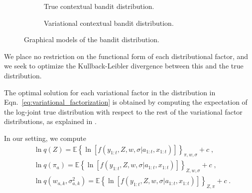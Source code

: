 \documentclass{article}
\newcommand{\eValue}[1]{\mathbb{E}\left\{ #1 \right\}}
\begin{document}
\begin{figure}[!h]
	\centering
	\begin{subfigure}[b]{0.49\textwidth}
		\begin{center}
			
		\end{center}
		\label{fig:true_bandit}
		\caption{True contextual bandit distribution.}
	\end{subfigure}
	\begin{subfigure}[b]{0.49\textwidth}	
		\begin{center}
			
		\end{center}
		\label{fig:variational_bandit}
		\caption{Variational contextual bandit distribution.}
	\end{subfigure}
	\caption{Graphical models of the bandit distribution.}
	\label{fig:graphical_bandit}
\end{figure}

We place no restriction on the functional form of each distributional factor, and we seek to optimize the Kullback-Leibler divergence between this and the true distribution.

The optimal solution for each variational factor in the distribution in Eqn.~\eqref{eq:variational_factorization} is obtained by computing the expectation of the log-joint true distribution with respect to the rest of the variational factor distributions, as explained in \cite{b-Bishop2006}.

In our setting, we compute
\begin{equation}
\begin{split}
&\ln q(Z) =\eValue{\ln\left[f(y_{1:t}, Z, w, \sigma|a_{1:t}, x_{1:t})\right]}_{\pi, w, \sigma}+c \;, \\
&\ln q(\pi_a) =\eValue{\ln\left[f(y_{1:t}, Z, w, \sigma|a_{1:t}, x_{1:t})\right]}_{Z, w, \sigma}+c \;,\\
&\ln q(w_{a,k},\sigma_{a,k}^2) =\eValue{\ln\left[f(y_{1:t}, Z, w, \sigma|a_{1:t}, x_{1:t})\right]}_{Z,\pi}+c \;.\\
\end{split}
\end{equation}
\end{document}
